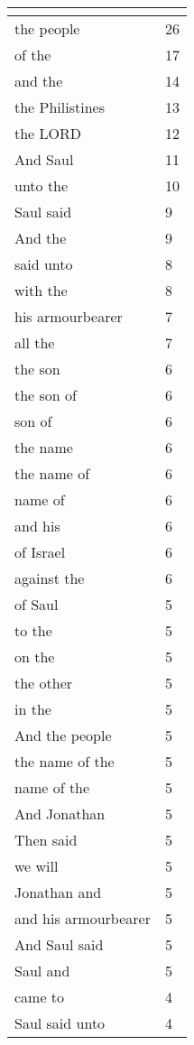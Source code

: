 \begin{center}
\begin{longtable}{|p{3.0in}|p{0.5in}|}
\hline \multicolumn{2}{c}{{ }} \\ \hline
\endfoot 
the people & 26\\ \hline 
of the & 17\\ \hline 
and the & 14\\ \hline 
the Philistines & 13\\ \hline 
the LORD & 12\\ \hline 
And Saul & 11\\ \hline 
unto the & 10\\ \hline 
Saul said & 9\\ \hline 
And the & 9\\ \hline 
said unto & 8\\ \hline 
with the & 8\\ \hline 
his armourbearer & 7\\ \hline 
all the & 7\\ \hline 
the son & 6\\ \hline 
the son of & 6\\ \hline 
son of & 6\\ \hline 
the name & 6\\ \hline 
the name of & 6\\ \hline 
name of & 6\\ \hline 
and his & 6\\ \hline 
of Israel & 6\\ \hline 
against the & 6\\ \hline 
of Saul & 5\\ \hline 
to the & 5\\ \hline 
on the & 5\\ \hline 
the other & 5\\ \hline 
in the & 5\\ \hline 
And the people & 5\\ \hline 
the name of the & 5\\ \hline 
name of the & 5\\ \hline 
And Jonathan & 5\\ \hline 
Then said & 5\\ \hline 
we will & 5\\ \hline 
Jonathan and & 5\\ \hline 
and his armourbearer & 5\\ \hline 
And Saul said & 5\\ \hline 
Saul and & 5\\ \hline 
came to & 4\\ \hline 
Saul said unto & 4\\ \hline 

\end{longtable}
\end{center}
